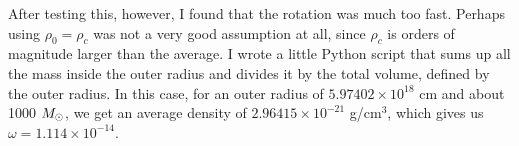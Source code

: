\documentclass[a4paper]{tufte-handout}
\begin{document}
After testing this, however, I found that the rotation was much too fast. Perhaps using $\rho_0 = \rho_c$ was not a very good assumption at all, since $\rho_c$ is orders of magnitude larger than the average. I wrote a little Python script that sums up all the mass inside the outer radius and divides it by the total volume, defined by the outer radius. In this case, for an outer radius of $5.97402\times 10^{18}$ cm and about 1000 $M_\odot$, we get an average density of $2.96415\times 10^{-21}$ g/cm$^3$, which gives us $\omega = 1.114 \times 10^{-14}$.





\end{document}
